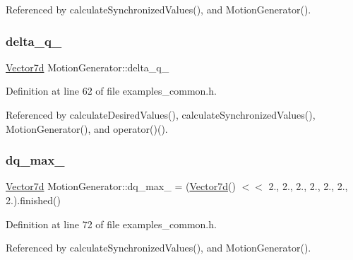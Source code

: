 Referenced by calculate\+Synchronized\+Values(), and Motion\+Generator().

\mbox{\label{classMotionGenerator_a943798bdc9c985f66548c59d562fd8b7}} 
\subsubsection{\texorpdfstring{delta\+\_\+q\+\_\+}{delta\_q\_}}
{\footnotesize\ttfamily \hyperlink{classMotionGenerator_a499bd17d3a5c7583b4c06923f532185d}{Vector7d} Motion\+Generator\+::delta\+\_\+q\+\_\+\hspace{0.3cm}{\ttfamily [private]}}



Definition at line 62 of file examples\+\_\+common.\+h.



Referenced by calculate\+Desired\+Values(), calculate\+Synchronized\+Values(), Motion\+Generator(), and operator()().

\mbox{\label{classMotionGenerator_af7cb3714dc8d242ac0a827838c4a977d}} 
\subsubsection{\texorpdfstring{dq\+\_\+max\+\_\+}{dq\_max\_}}
{\footnotesize\ttfamily \hyperlink{classMotionGenerator_a499bd17d3a5c7583b4c06923f532185d}{Vector7d} Motion\+Generator\+::dq\+\_\+max\+\_\+ = (\hyperlink{classMotionGenerator_a499bd17d3a5c7583b4c06923f532185d}{Vector7d}() $<$$<$ 2., 2., 2., 2., 2., 2., 2.).finished()\hspace{0.3cm}{\ttfamily [private]}}



Definition at line 72 of file examples\+\_\+common.\+h.



Referenced by calculate\+Synchronized\+Values(), and Motion\+Generator().

\mbox{\label{classMotionGenerator_a4924578b9275d362c015b16f80232263}} 
